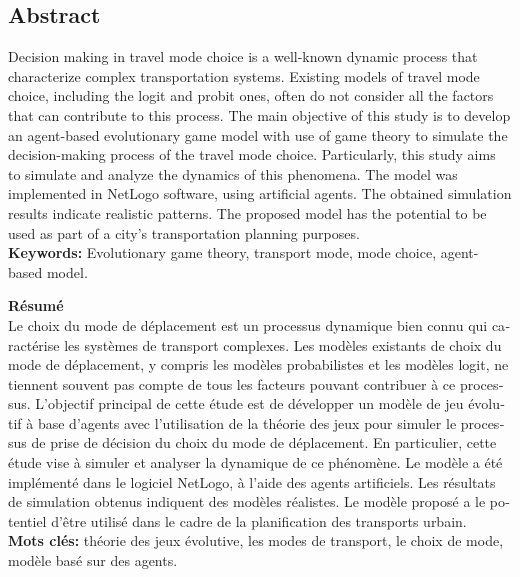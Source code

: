 \documentclass[12pt]{report}
\begin{document}
\clearpage
\begin{center}

\section*{Abstract}
\thispagestyle{empty}

Decision making in travel mode choice is a well-known dynamic process that characterize complex transportation systems. Existing models of travel mode choice, including the logit and probit ones, often do not consider all the factors that can contribute to this process. The main objective of this study is to develop an agent-based evolutionary game model with use of game theory to simulate the decision-making process of the travel mode choice. Particularly, this study aims to simulate and analyze the dynamics of this phenomena. The model was implemented in NetLogo software, using artificial agents. The obtained simulation results indicate realistic patterns. The proposed model has the potential to be used as part of a city's transportation planning purposes.\\
\textbf{Keywords: }
\vspace{0.2cm}
Evolutionary game theory, transport mode, mode choice, agent-based model.
\\
\vspace{0.2cm}
   \begin{otherlanguage}{french}
   \textbf{Résumé}\\
   \vspace{0.2cm}
Le choix du mode de déplacement est un processus dynamique bien connu qui caractérise les systèmes de transport complexes. Les modèles existants de choix du mode de déplacement, y compris les modèles probabilistes et les modèles logit, ne tiennent souvent pas compte de tous les facteurs pouvant contribuer à ce processus. L'objectif principal de cette étude est de développer un modèle de jeu évolutif à base d'agents avec l'utilisation de la théorie des jeux pour simuler le processus de prise de décision du choix du mode de déplacement. En particulier, cette étude vise à simuler et analyser la dynamique de ce phénomène. Le modèle a été implémenté dans le logiciel NetLogo, à l'aide des agents artificiels. Les résultats de simulation obtenus indiquent des modèles réalistes. Le modèle proposé a le potentiel d'être utilisé dans le cadre de la planification des transports urbain.\\
\textbf{Mots clés:} théorie des jeux évolutive, les modes de transport, le choix de mode, modèle basé sur des agents.
\vspace{0.2cm}
\end{otherlanguage}
  \\
  

\end{center}
\end{document}
